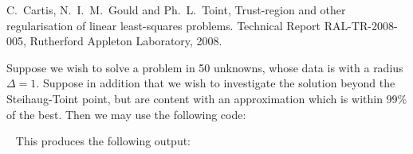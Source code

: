 \documentclass{galahad}
\begin{document}
\noindent  
C.\ Cartis, N.\ I.\ M.\ Gould and Ph.\ L.\ Toint,
Trust-region and other regularisation of linear 
least-squares problems.
Technical Report RAL-TR-2008-005, Rutherford Appleton Laboratory, 2008.


\galexample
Suppose we wish to solve a problem in 50 unknowns, whose data is 
with a radius $\Delta = 1$. Suppose in addition that we wish to investigate
the solution beyond the Steihaug-Toint point, but are content with 
an approximation which is within 99\% of the best.
Then we may use the following code:

{\tt \small
\VerbatimInput{\packageexample}
}
\noindent
This produces the following output:
{\tt \small
\VerbatimInput{\packageresults}
}
\end{document}
